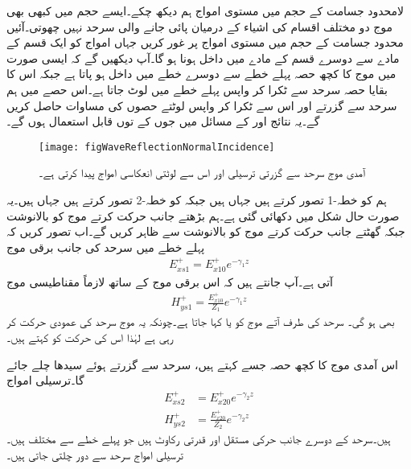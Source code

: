 لامحدود جسامت کے حجم میں مستوی امواج ہم دیکھ چکے۔ایسے حجم میں کبھی بھی موج دو مختلف اقسام کی اشیاء کے درمیان پائی جانے والی سرحد نہیں چھوتی۔آئیں محدود جسامت کے حجم میں مستوی امواج پر غور کریں جہاں امواج کو ایک قسم کے مادے سے دوسرے قسم کے مادے میں داخل ہونا ہو گا۔آپ دیکھیں گے کہ ایسی صورت میں موج کا کچھ حصہ پہلے خطے سے دوسرے خطے میں داخل ہو پاتا ہے جبکہ اس کا بقایا حصہ سرحد سے ٹکرا کر واپس پہلے خطے میں لوٹ جاتا ہے۔اس حصے میں ہم سرحد سے گزرتے اور اس سے ٹکرا کر واپس لوٹتے حصوں کی مساوات حاصل کریں گے۔یہ نتائج   اور   کے مسائل میں جوں کے توں قابل استعمال ہوں گے۔
\begin{figure}
\centering
\texttt{[image: figWaveReflectionNormalIncidence]}
\caption{آمدی موج سرحد سے گزرتی ترسیلی اور اس سے  لوٹتی انعکاسی امواج پیدا کرتی ہے۔}
\label{شکل_موج_آمدی_انعکاسی_ترسیلی}
\end{figure}

ہم  کو خطہ-1 تصور کرتے ہیں جہاں  ہیں جبکہ  کو خطہ-2 تصور کرتے ہیں جہاں  ہیں۔یہ صورت حال شکل  میں دکھائی گئی ہے۔ہم بڑھتے  جانب حرکت کرتے موج کو بالانوشت  جبکہ گھٹتے  جانب حرکت کرتے موج کو بالانوشت  سے ظاہر کریں گے۔اب تصور کریں کہ پہلے خطے میں سرحد کی جانب برقی موج
\begin{align}\label{مساوات_موج_برقی_الف_آمد}
E_{xs1}^+=E_{x10}^+e^{-\gamma_1 z}
\end{align}
آتی ہے۔آپ جانتے ہیں کہ اس برقی موج کے ساتھ لازماً مقناطیسی موج
\begin{align}
H_{ys1}^+=\frac{E_{x10}^+}{Z_1} e^{-\gamma_1 z}\label{مساوات_موج_مقناطیسی_الف_آمد}
\end{align}
بھی ہو گی۔ سرحد کی طرف آتے موج کو  یا  کہا جاتا ہے۔چونکہ یہ موج سرحد کی عمودی حرکت کر رہی ہے لہٰذا اس کی حرکت کو  کہتے ہیں۔

اس آمدی موج کا کچھ حصہ جسے  کہتے ہیں، سرحد سے گزرتے ہوئے  سیدھا چلے جائے گا۔ترسیلی امواج
\begin{align}
E_{xs2}^+&=E_{x20}^+e^{-\gamma_2 z}\label{مساوات_موج_برقی_ب_ترسیلی}\\
H_{ys2}^+&=\frac{E_{x20}^+}{Z_2} e^{-\gamma_2 z}\label{مساوات_موج_مقناطیسی_ب_ترسیلی}
\end{align}
ہیں۔سرحد کے دوسرے جانب حرکی مستقل  اور قدرتی رکاوٹ  ہیں جو پہلے خطے سے مختلف ہیں۔ترسیلی امواج سرحد سے دور چلتی جاتی ہیں۔

